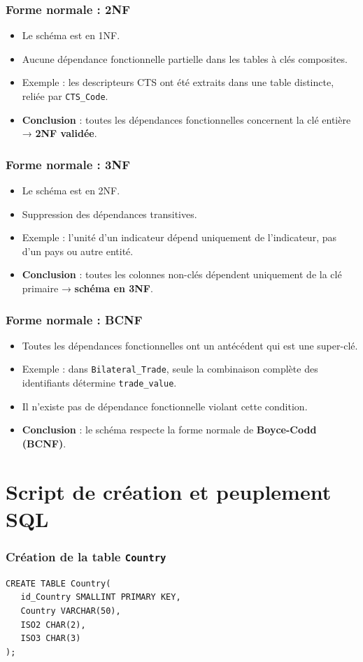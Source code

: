 \documentclass[11pt]{beamer}
\begin{document}
\begin{frame}
  \frametitle{Forme normale : 2NF}
  \begin{itemize}
    \item Le schéma est en 1NF.
    \item Aucune dépendance fonctionnelle partielle dans les tables à clés composites.
    \item Exemple : les descripteurs CTS ont été extraits dans une table distincte, reliée par \texttt{CTS\_Code}.
    \item \textbf{Conclusion} : toutes les dépendances fonctionnelles concernent la clé entière → \textbf{2NF validée}.
  \end{itemize}
\end{frame}

\begin{frame}
  \frametitle{Forme normale : 3NF}
  \begin{itemize}
    \item Le schéma est en 2NF.
    \item Suppression des dépendances transitives.
    \item Exemple : l’unité d’un indicateur dépend uniquement de l’indicateur, pas d’un pays ou autre entité.
    \item \textbf{Conclusion} : toutes les colonnes non-clés dépendent uniquement de la clé primaire → \textbf{schéma en 3NF}.
  \end{itemize}
\end{frame}

\begin{frame}
  \frametitle{Forme normale : BCNF}
  \begin{itemize}
    \item Toutes les dépendances fonctionnelles ont un antécédent qui est une super-clé.
    \item Exemple : dans \texttt{Bilateral\_Trade}, seule la combinaison complète des identifiants détermine \texttt{trade\_value}.
    \item Il n'existe pas de dépendance fonctionnelle violant cette condition.
    \item \textbf{Conclusion} : le schéma respecte la forme normale de \textbf{Boyce-Codd (BCNF)}.
  \end{itemize}
\end{frame}


\section{Script de création et peuplement SQL}
\begin{frame}[fragile]
  \frametitle{Création de la table \texttt{Country}}
\begin{verbatim}
CREATE TABLE Country(
   id_Country SMALLINT PRIMARY KEY,
   Country VARCHAR(50),
   ISO2 CHAR(2),
   ISO3 CHAR(3)
);
\end{verbatim}
\end{frame}
\end{document}
